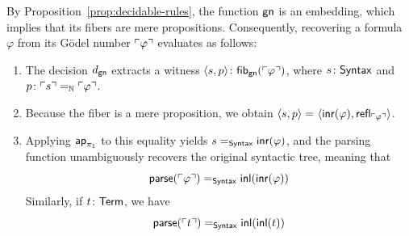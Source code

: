 \begin{rem}
     By Proposition~\ref{prop:decidable-rules}, the function $\mathsf{gn}$ is an embedding, which implies that its fibers are mere propositions. Consequently, recovering a formula~$\varphi$ from its G\"odel number $\ulcorner\varphi\urcorner$ evaluates as follows:
    \begin{enumerate}[1.,font=\small]
        \item The decision $d_{\mathsf{gn}}$ extracts a witness $\dep{s,p}\colon\fun{fib}_{\fun{gn}}(\gn{\varphi})$, where $s\colon\fun{Syntax}$ and $p\colon\gn{s}\eq{\N}\gn{\varphi}$.
    
        \item Because the fiber is a mere proposition, we obtain $\langle s,p\rangle\mathrel{=_{}}\langle\mathsf{inr}(\varphi),\mathsf{refl}_{\ulcorner\varphi\urcorner}\rangle$.
    
        \item Applying $\mathsf{ap}_{\pi_1}$ to this equality yields $s\mathrel{=_{\mathsf{Syntax}}}\mathsf{inr}(\varphi)$, and the parsing function unambiguously recovers the original syntactic tree, meaning that
        \begin{equation}\label{eq:parse-gn-form}
            \mathsf{parse}(\ulcorner\varphi\urcorner)
                \mathrel{=_{\mathsf{Syntax}}}
                    \mathsf{inl}(\mathsf{inr}(\varphi))
        \end{equation}
        Similarly, if $t\colon\fun{Term}$, we have
            \begin{equation}\label{eq:parse-gn-term}
                \mathsf{parse}(\ulcorner t\urcorner)
                    \mathrel{=_{\mathsf{Syntax}}}
                        \mathsf{inl}(\mathsf{inl}(t))
            \end{equation}
    \end{enumerate}    
\end{rem}

